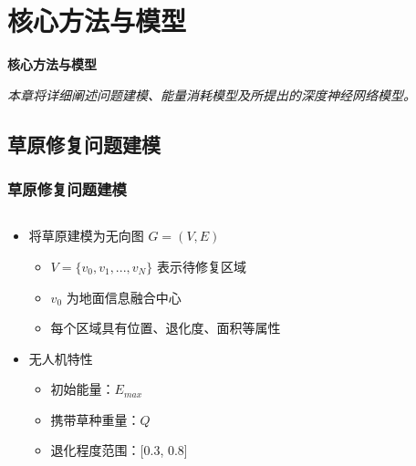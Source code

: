 \documentclass[10pt, aspectratio=169]{beamer}  %
\begin{document}
\section{核心方法与模型}
\begin{frame}
	\centering %
	{\Huge \sffamily\bfseries\textcolor{njupt}{核心方法与模型}}
	\par %
	\vspace{0.5cm} %
	{\large \itshape{本章将详细阐述问题建模、能量消耗模型及所提出的深度神经网络模型。}} %
\end{frame}

\subsection{草原修复问题建模}
\begin{frame}
	\frametitle{草原修复问题建模}
	\begin{columns}
		\begin{column}{0.4\textwidth}
			\begin{itemize}
				\item 将草原建模为无向图 $G = (V, E)$
				      \begin{itemize}
					      \item $V = \{v_0, v_1, ..., v_N \}$ 表示待修复区域
					      \item $v_0$ 为地面信息融合中心
					      \item 每个区域具有位置、退化度、面积等属性
				      \end{itemize}
				\item 无人机特性
				      \begin{itemize}
					      \item 初始能量：$E_{max}$
					      \item 携带草种重量：$Q$
					      \item 退化程度范围：[0.3, 0.8]
				      \end{itemize}
			\end{itemize}
		\end{column}
		\begin{column}{0.6\textwidth}
			\centering
			
		\end{column}
	\end{columns}
\end{frame}
\end{document}
